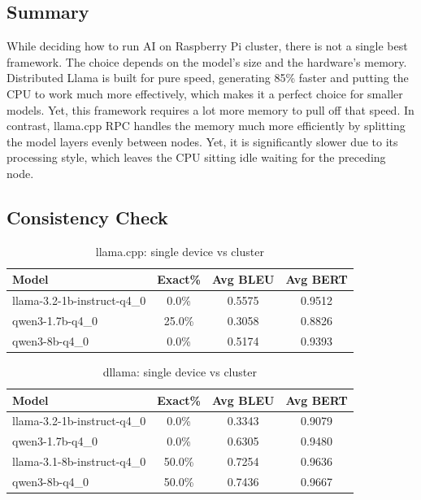 \subsection{Summary}
While deciding how to run AI on Raspberry Pi cluster, there is not a single best framework. The choice depends on the model's size and the hardware's memory. Distributed Llama is built for pure speed, generating 85\% faster and putting the CPU to work much more effectively, which makes it a perfect choice for smaller models. Yet, this framework requires a lot more memory to pull off that speed. In contrast, llama.cpp RPC handles the memory much more efficiently by splitting the model layers evenly between nodes. Yet, it is significantly slower due to its processing style, which leaves the CPU sitting idle waiting for the preceding node. 

\subsection{Consistency Check}
\begin{table}[H]
\centering
\caption{llama.cpp: single device vs cluster}
\label{tab:model-breakdown}
\begin{tabular}{lccc}
\hline
\textbf{Model} & \textbf{Exact\%} & \textbf{Avg BLEU} & \textbf{Avg BERT} \\ 
\hline
llama-3.2-1b-instruct-q4\_0 & 0.0\%  & 0.5575 & 0.9512 \\
qwen3-1.7b-q4\_0            & 25.0\% & 0.3058 & 0.8826 \\
qwen3-8b-q4\_0              & 0.0\%  & 0.5174 & 0.9393 \\ 
\hline
\end{tabular}
\end{table}

\begin{table}[H]
\centering
\caption{dllama: single device vs cluster}
\label{tab:model-breakdown-3}
\begin{tabular}{lccc}
\hline
\textbf{Model} & \textbf{Exact\%} & \textbf{Avg BLEU} & \textbf{Avg BERT} \\ 
\hline
llama-3.2-1b-instruct-q4\_0 & 0.0\%  & 0.3343 & 0.9079 \\
qwen3-1.7b-q4\_0            & 0.0\%  & 0.6305 & 0.9480 \\
llama-3.1-8b-instruct-q4\_0 & 50.0\% & 0.7254 & 0.9636 \\
qwen3-8b-q4\_0              & 50.0\% & 0.7436 & 0.9667 \\ 
\hline
\end{tabular}
\end{table}

